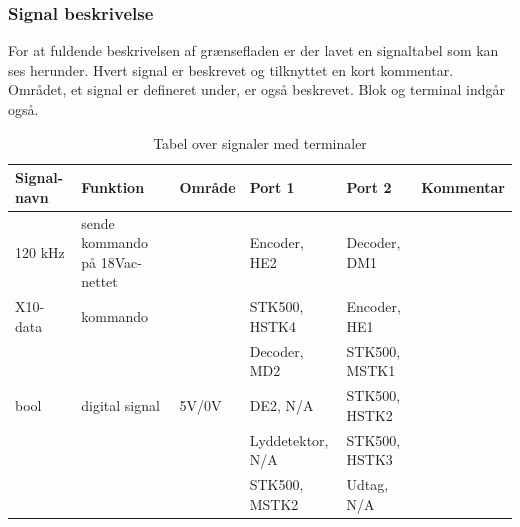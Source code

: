 \begin{table}[H]
\subsubsection{Signal beskrivelse}
For at fuldende beskrivelsen af grænsefladen er der lavet en signaltabel som kan ses herunder. Hvert signal er beskrevet og tilknyttet en kort kommentar. Området, et signal er defineret under, er også beskrevet. Blok og terminal indgår også. 
\caption{Tabel over signaler med terminaler}
\begin{small}
\begin{tabular}{|p{2cm}|p{2cm}|p{2cm}|p{2cm}|p{2cm}|p{}|}
\hline
\textbf{Signal-navn} & \textbf{Funktion} & \textbf{Område} & \textbf{Port 1} & \textbf{Port 2} & \textbf{Kommentar} \\ \hline

120 kHz & sende kommando på 18Vac-nettet & & Encoder, HE2 & Decoder, DM1 & \\ \hline

X10-data & kommando & & STK500, HSTK4 & Encoder, HE1 & \\ \cline{4-5}
&&& Decoder, MD2 & STK500, MSTK1 &\\ \hline

bool & digital signal & 5V/0V & DE2, N/A & STK500, HSTK2 & \\ \cline{4-5}
&&& Lyddetektor, N/A & STK500, HSTK3 & \\ \cline{4-5}
&&& STK500, MSTK2 & Udtag, N/A & \\ \hline
\end{tabular}
\end{small}
\label{table:Signaltabel}
\end{table}


